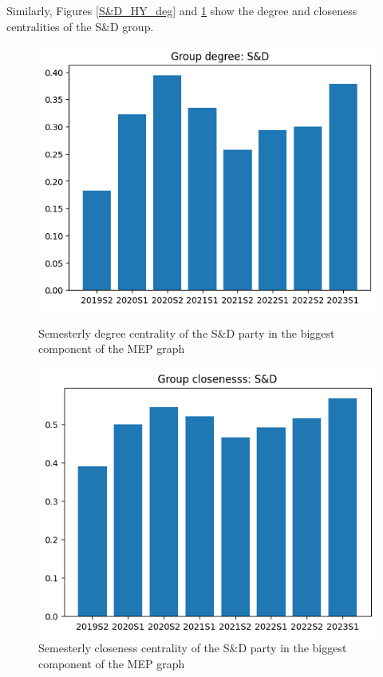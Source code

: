 \documentclass[lettersize,journal]{IEEEtran}
\begin{document}
Similarly, Figures \ref{S&D_HY_deg} and \ref{S&D_HY_cls} show the degree and closeness centralities of the S\&D group.

\begin{figure}[h]
  \centering
  \begin{minipage}[b]{0.23\textwidth}
    \includegraphics[width=\textwidth]{S&D_HY_deg.png}
    \caption{Semesterly degree centrality of the S\&D party in the biggest component of the MEP graph}
    \label{S&D_HY_deg}
  \end{minipage}
  \hfill
  \begin{minipage}[b]{0.23\textwidth}
    \includegraphics[width=\textwidth]{S&D_HY_cls.png}
    \caption{Semesterly closeness centrality of the S\&D party in the  biggest component of the MEP graph}
    \label{S&D_HY_cls}
  \end{minipage}
\end{figure}
\end{document}
